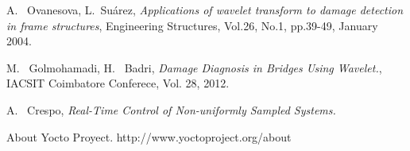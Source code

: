 \documentclass[journal,trans]{IEEEtran}
\begin{document}
\begin{thebibliography}{1}
A.~ Ovanesova, L.~Suárez, \emph{Applications of wavelet transform to damage detection in frame structures}, Engineering Structures, Vol.26, No.1, pp.39-49, January 2004.

M.~ Golmohamadi, H.~ Badri, \emph{ Damage Diagnosis in Bridges Using Wavelet.}, IACSIT Coimbatore Conferece, Vol. 28, 2012.

A.~ Crespo, \emph{ Real-Time Control of Non-uniformly Sampled Systems.}

About Yocto Proyect. http://www.yoctoproject.org/about

\end{thebibliography}

% 










\end{document}
